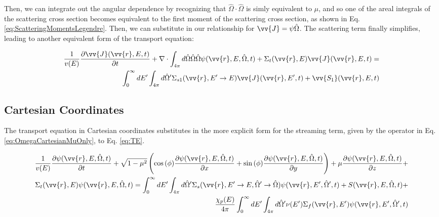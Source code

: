 \documentclass[10pt]{article}
\newcommand{\hO}{\hat{\Omega}}
\newcommand{\spa}{(\vv{r}, E, \hO, t)}
\begin{document}
\begin{flushleft}
Then, we can integrate out the angular dependence by recognizing that \(\hO  \cdot\hO  \) is simly equivalent to \(\mu\), and so one of the areal integrals of the scattering cross section becomes equivalent to the first moment of the scattering cross section, as shown in Eq. \ref{eq:ScatteringMomentsLegendre}. Then, we can substitute in our relationship for \(\vv{J} = \psi\hO  \). The scattering term finally simplifies, leading to another equivalent form of the transport equation:

\begin{equation}
\label{eq:TEAngleAngleIntegrated2}
\begin{aligned}
\frac{1}{v(E)} \frac{\partial\vv{J}(\vv{r}, E, t)}{\partial t} +
 \nabla\cdot \int_{4\pi}^{} d\hO   \hO  \hO  \psi(\vv{r}, E, \hO  ,t) + 
 \Sigma_t(\vv{r},E)\vv{J}(\vv{r}, E, t) = \\
 \int_{0}^{\infty}dE' \int_{4\pi}^{ } d\hO  ' \Sigma_{s1}(\vv{r}, E'\rightarrow E)\vv{J}(\vv{r}, E', t) + \vv{S_1}(\vv{r}, E, t)\\
\end{aligned}
\end{equation}

\subsection{Cartesian Coordinates}

The transport equation in Cartesian coordinates substitutes in the more explicit form for the streaming term, given by the operator in Eq. \ref{eq:OmegaCartesianMuOnly}, to Eq. \ref{eq:TE}. 

\begin{equation}
\label{eq:TE_Cartesian}
\begin{aligned}
\frac{1}{v(E)} \frac{\partial\psi(\vv{r}, E, \hO  ,t)}{\partial t} +
 \sqrt{1-\mu^2}\left(\cos{(\phi)}\frac{\partial \psi(\vv{r}, E, \hO  ,t)}{\partial x} + \sin{(\phi)} \frac{\partial \psi(\vv{r}, E, \hO  ,t)}{\partial y}\right) + \mu \frac{\partial \psi(\vv{r}, E, \hO  ,t)}{\partial z} +\\
 \Sigma_t(\vv{r},E)\psi(\vv{r}, E, \hO  ,t) = \int_{0}^{\infty}dE' \int_{4\pi}^{ } d\hO  ' \Sigma_s(\vv{r}, E'\rightarrow E, \hO  '\rightarrow\hO  )\psi(\vv{r}, E', \hO  ',t) + S\spa +\\
 \frac{\chi_p(E)}{4\pi} \int_{0}^{\infty} dE'\int_{4\pi}^{} d\hO  '\nu(E')\Sigma_f(\vv{r}, E')\psi(\vv{r}, E', \hO  ',t)\\
\end{aligned}
\end{equation}


\end{flushleft}
\end{document}
